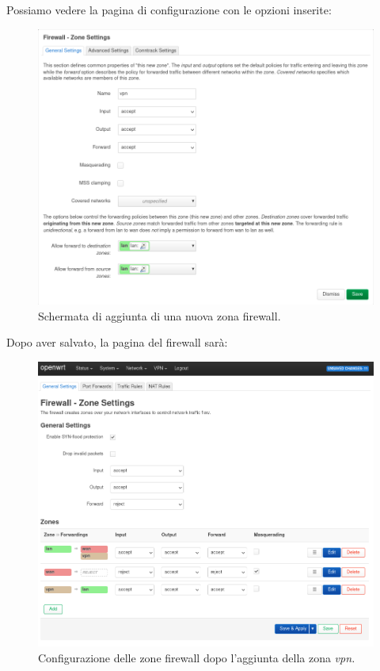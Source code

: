Possiamo vedere la pagina di configurazione con le opzioni inserite:

\begin{figure}[H]
    \centering
    \includegraphics[width=1\linewidth]{immagini/LuCI_firewall_vpn1}
    \caption{Schermata di aggiunta di una nuova zona firewall.}
    \label{fig:luci-firewall-vpn}
\end{figure}

Dopo aver salvato, la pagina del firewall sarà:

\begin{figure}[H]
    \centering
    \includegraphics[width=1\linewidth]{immagini/LuCI_firewall_end1}
    \caption{Configurazione delle zone firewall dopo l'aggiunta della zona \it{vpn}.}
    \label{fig:luci-firewall-end}
\end{figure}

